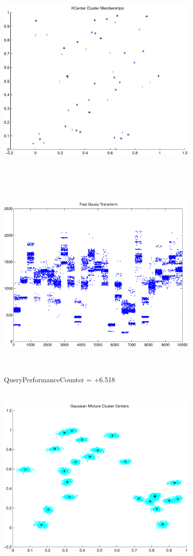 \documentclass[9pt]{article}
\theoremstyle{plain}
\theoremstyle{definition}
\theoremstyle{remark}
\numberwithin{equation}{section}
\begin{document}
\includegraphics[width=10.0cm,height=10.0cm]{KCenterClusterMemberships_25_Centers.pdf}

\includegraphics[width=10.0cm,height=10.0cm]{FGT25_Centers.pdf}

QueryPerformanceCounter  =  +6.518
\includegraphics[width=10.0cm,height=10.0cm]{GaussianMixture_ClusterCenters24_Centers.pdf}
\end{document}
